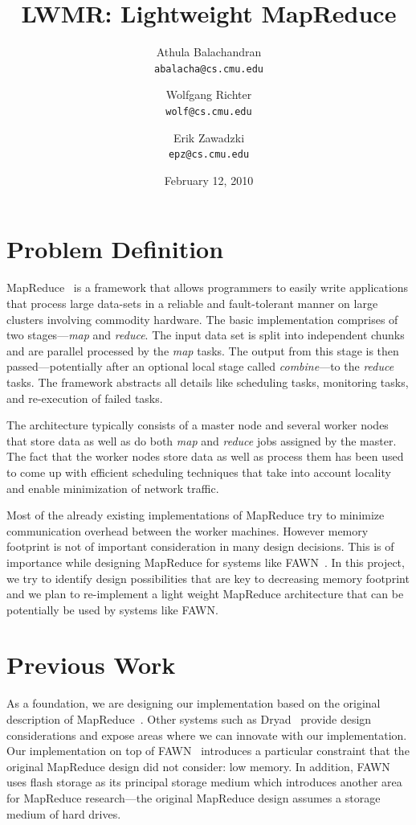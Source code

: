 \documentclass[10pt,letter,final,article,twocolumn]{article} %
\title{LWMR: Lightweight MapReduce}
\author{Athula Balachandran \\
{\tt abalacha@cs.cmu.edu}
\and
Wolfgang Richter \\
{\tt wolf@cs.cmu.edu}
\and
Erik Zawadzki \\
{\tt epz@cs.cmu.edu}}
\date{February 12, 2010} %
\begin{document}
\pagestyle{empty}
\maketitle
\thispagestyle{empty}

\section{Problem Definition}
MapReduce~\cite{mapreduce08} is a framework that allows programmers to easily write applications that process large data-sets in a reliable and fault-tolerant manner on large clusters involving commodity hardware. The basic implementation  comprises of two stages---\emph{map} and \emph{reduce}. The input data set is split into independent chunks and are parallel processed by the \emph{map} tasks. The output from this stage is then passed---potentially after an optional local stage called \emph{combine}---to the \emph{reduce} tasks. The framework abstracts all details like scheduling tasks, monitoring tasks, and re-execution of failed tasks. 

The architecture typically consists of a master node and several worker nodes that store data as well as do both \emph{map} and \emph{reduce} jobs assigned by the master. The fact that the worker nodes store data as well as process them has been used to come up with efficient scheduling techniques that take into account locality and enable minimization of network traffic.

Most of the already existing implementations of MapReduce try to minimize communication overhead between the worker machines. However memory footprint is not of important consideration in many design decisions. This is of importance while designing MapReduce for systems like FAWN~\cite{fawn09}. In this project, we try to identify design possibilities that are key to decreasing memory footprint and we plan to re-implement a light weight MapReduce architecture that can be potentially be used by systems like FAWN.

\section{Previous Work}

As a foundation, we are designing our implementation based on the original 
description of MapReduce~\cite{mapreduce08}.  Other systems such as
Dryad~\cite{dryad07} provide design considerations and expose areas
where we can innovate with our implementation.  Our implementation on top
of FAWN~\cite{fawn09} introduces a particular constraint that the original
MapReduce design did not consider: low memory.  In addition, FAWN uses
flash storage as its principal storage medium which introduces another
area for MapReduce research---the original MapReduce design assumes a
storage medium of hard drives.  
\end{document}
